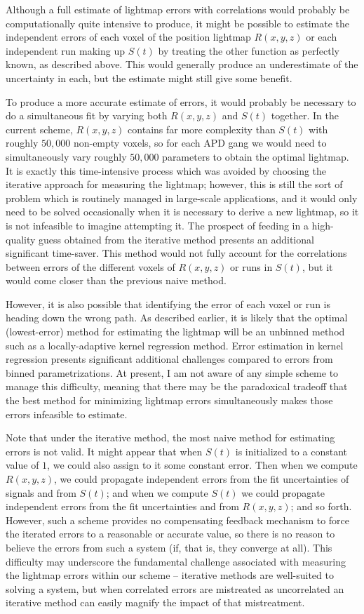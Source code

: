Although a full estimate of lightmap errors with correlations would probably be computationally quite intensive to produce, it might be possible to estimate the independent errors of each voxel of the position lightmap $R(x,y,z)$ or each independent run making up $S(t)$ by treating the other function as perfectly known, as described above.  This would generally produce an underestimate of the uncertainty in each, but the estimate might still give some benefit.

To produce a more accurate estimate of errors, it would probably be necessary to do a simultaneous fit by varying both $R(x,y,z)$ and $S(t)$ together.  In the current scheme, $R(x,y,z)$ contains far more complexity than $S(t)$ with roughly $50,000$ non-empty voxels, so for each APD gang we would need to simultaneously vary roughly $50,000$ parameters to obtain the optimal lightmap.  It is exactly this time-intensive process which was avoided by choosing the iterative approach for measuring the lightmap; however, this is still the sort of problem which is routinely managed in large-scale applications, and it would only need to be solved occasionally when it is necessary to derive a new lightmap, so it is not infeasible to imagine attempting it.  The prospect of feeding in a high-quality guess obtained from the iterative method presents an additional significant time-saver.  This method would not fully account for the correlations between errors of the different voxels of $R(x,y,z)$ or runs in $S(t)$, but it would come closer than the previous naive method.

However, it is also possible that identifying the error of each voxel or run is heading down the wrong path.  As described earlier, it is likely that the optimal (lowest-error) method for estimating the lightmap will be an unbinned method such as a locally-adaptive kernel regression method.  Error estimation in kernel regression presents significant additional challenges compared to errors from binned parametrizations.  At present, I am not aware of any simple scheme to manage this difficulty, meaning that there may be the paradoxical tradeoff that the best method for minimizing lightmap errors simultaneously makes those errors infeasible to estimate.

Note that under the iterative method, the most naive method for estimating errors is not valid.  It might appear that when $S(t)$ is initialized to a constant value of $1$, we could also assign to it some constant error.  Then when we compute $R(x,y,z)$, we could propagate independent errors from the fit uncertainties of signals and from $S(t)$; and when we compute $S(t)$ we could propagate independent errors from the fit uncertainties and from $R(x,y,z)$; and so forth.  However, such a scheme provides no compensating feedback mechanism to force the iterated errors to a reasonable or accurate value, so there is no reason to believe the errors from such a system (if, that is, they converge at all).  This difficulty may underscore the fundamental challenge associated with measuring the lightmap errors within our scheme -- iterative methods are well-suited to solving a system, but when correlated errors are mistreated as uncorrelated an iterative method can easily magnify the impact of that mistreatment.

